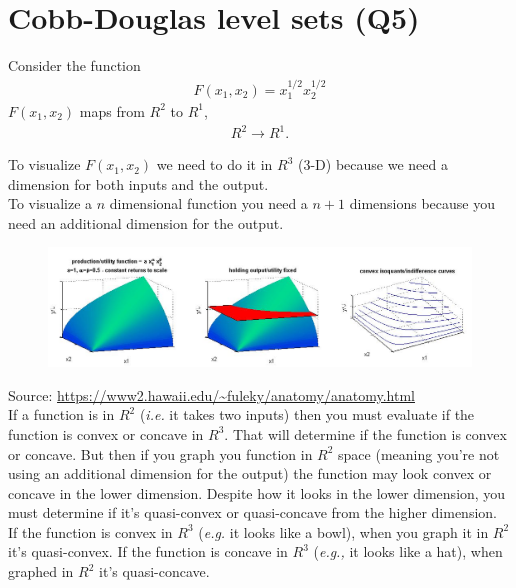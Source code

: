 \documentclass{article}
\begin{document}
\section{Cobb-Douglas level sets (Q5)}


Consider the function 
\begin{align*}
    F(x_1, x_2) = x_1^{1/2} x_2^{1/2}
\end{align*}
$F(x_1, x_2)$ maps from $R^2$ to $R^1$, 
\begin{align*}
    R^2 \to R^1.
\end{align*}

To visualize $F(x_1, x_2)$ we need to do it in $R^3$ (3-D) because we need a dimension for both inputs and the output.\\

To visualize a $n$ dimensional function you need a $n+1$ dimensions because you need an additional dimension for the output.

\begin{figure}[htp]
    \centering
        \includegraphics[width=1\textwidth]{Screen Shot 2023-09-18 at 2.03.06 PM.png}
\end{figure}

Source: \url{https://www2.hawaii.edu/~fuleky/anatomy/anatomy.html}\\



If a function is in $R^2$ (\textit{i.e.} it takes two inputs) then you must evaluate if  the function is convex or concave in $R^3$. That will determine if the function is convex or concave. But then if you graph you function in $R^2$ space (meaning you're not using an additional dimension for the output) the function may look convex or concave in the lower dimension. Despite how it looks in the lower dimension, you must determine if it's quasi-convex or quasi-concave from the higher dimension.  \\

If the function is convex in $R^3$ (\textit{e.g.} it looks like a bowl), when you graph it in $R^2$ it's quasi-convex. If the function is concave in $R^3$ (\textit{e.g.,} it looks like a hat), when graphed in $R^2$ it's quasi-concave. \\
\end{document}
